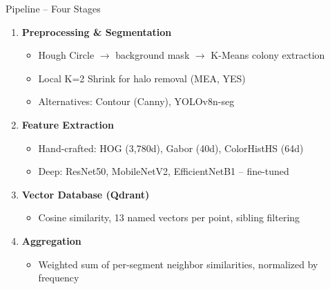 \documentclass[aspectratio=169]{beamer}
\begin{document}
\begin{frame}{Pipeline -- Four Stages}
  \begin{enumerate}
    \item \textbf{Preprocessing \& Segmentation}
    \begin{itemize}
      \item Hough Circle $\rightarrow$ background mask $\rightarrow$ K-Means colony extraction
      \item Local K=2 Shrink for halo removal (MEA, YES)
      \item Alternatives: Contour (Canny), YOLOv8n-seg
    \end{itemize}
    \vspace{0.3em}
    \item \textbf{Feature Extraction}
    \begin{itemize}
      \item Hand-crafted: HOG (3,780d), Gabor (40d), ColorHistHS (64d)
      \item Deep: ResNet50, MobileNetV2, EfficientNetB1 -- fine-tuned
    \end{itemize}
    \vspace{0.3em}
    \item \textbf{Vector Database (Qdrant)}
    \begin{itemize}
      \item Cosine similarity, 13 named vectors per point, sibling filtering
    \end{itemize}
    \vspace{0.3em}
    \item \textbf{Aggregation}
    \begin{itemize}
      \item Weighted sum of per-segment neighbor similarities, normalized by frequency
    \end{itemize}
  \end{enumerate}
\end{frame}
\end{document}
